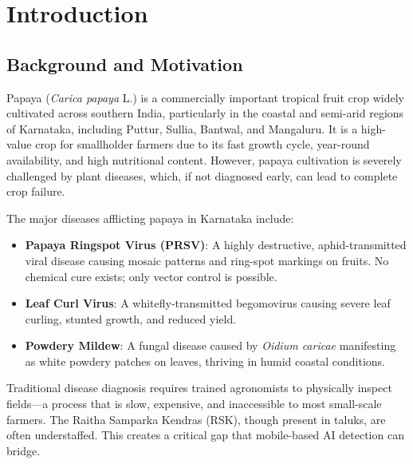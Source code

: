 \documentclass[12pt,a4paper]{report}
\begin{document}
\newpage
{}
\setcounter{page}{1}

\chapter{Introduction}

\section{Background and Motivation}
Papaya (\textit{Carica papaya} L.) is a commercially important tropical fruit crop widely cultivated across southern India, particularly in the coastal and semi-arid regions of Karnataka, including Puttur, Sullia, Bantwal, and Mangaluru. It is a high-value crop for smallholder farmers due to its fast growth cycle, year-round availability, and high nutritional content. However, papaya cultivation is severely challenged by plant diseases, which, if not diagnosed early, can lead to complete crop failure.

The major diseases afflicting papaya in Karnataka include:
\begin{itemize}
    \item \textbf{Papaya Ringspot Virus (PRSV)}: A highly destructive, aphid-transmitted viral disease causing mosaic patterns and ring-spot markings on fruits. No chemical cure exists; only vector control is possible.
    \item \textbf{Leaf Curl Virus}: A whitefly-transmitted begomovirus causing severe leaf curling, stunted growth, and reduced yield.
    \item \textbf{Powdery Mildew}: A fungal disease caused by \textit{Oidium caricae} manifesting as white powdery patches on leaves, thriving in humid coastal conditions.
\end{itemize}

Traditional disease diagnosis requires trained agronomists to physically inspect fields---a process that is slow, expensive, and inaccessible to most small-scale farmers. The Raitha Samparka Kendras (RSK), though present in taluks, are often understaffed. This creates a critical gap that mobile-based AI detection can bridge.
\end{document}
